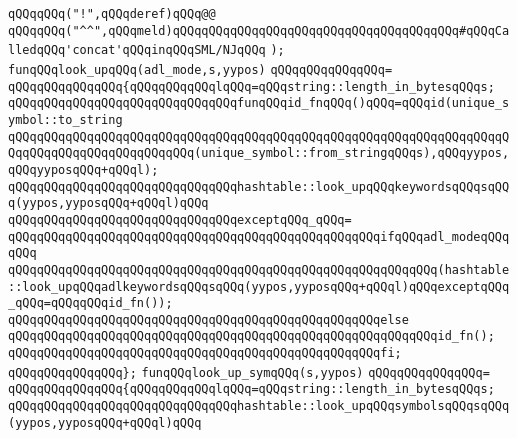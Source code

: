 \verb|qQQqqQQq("!",qQQqderef)qQQq@@|\newline
\verb|qQQqqQQq("^^",qQQqmeld)qQQqqQQqqQQqqQQqqQQqqQQqqQQqqQQqqQQqqQQq#qQQqCalledqQQq'concat'qQQqinqQQqSML/NJqQQq|\newline
\verb|);|\newline
\newline
\verb|funqQQqlook_upqQQq(adl_mode,s,yypos)|\newline
\verb|qQQqqQQqqQQqqQQq=|\newline
\verb|qQQqqQQqqQQqqQQq{qQQqqQQqqQQqlqQQq=qQQqstring::length_in_bytesqQQqs;|\newline
\newline
\verb|qQQqqQQqqQQqqQQqqQQqqQQqqQQqqQQqfunqQQqid_fnqQQq()qQQq=qQQqid(unique_symbol::to_string|\newline
\verb|qQQqqQQqqQQqqQQqqQQqqQQqqQQqqQQqqQQqqQQqqQQqqQQqqQQqqQQqqQQqqQQqqQQqqQQqqQQqqQQqqQQqqQQqqQQqqQQq(unique_symbol::from_stringqQQqs),qQQqyypos,qQQqyyposqQQq+qQQql);|\newline
\newline
\verb|qQQqqQQqqQQqqQQqqQQqqQQqqQQqqQQqhashtable::look_upqQQqkeywordsqQQqsqQQq(yypos,yyposqQQq+qQQql)qQQq|\newline
\verb|qQQqqQQqqQQqqQQqqQQqqQQqqQQqqQQqexceptqQQq_qQQq=|\newline
\verb|qQQqqQQqqQQqqQQqqQQqqQQqqQQqqQQqqQQqqQQqqQQqqQQqqQQqifqQQqadl_modeqQQqqQQq|\newline
\verb|qQQqqQQqqQQqqQQqqQQqqQQqqQQqqQQqqQQqqQQqqQQqqQQqqQQqqQQqqQQq(hashtable::look_upqQQqadlkeywordsqQQqsqQQq(yypos,yyposqQQq+qQQql)qQQqexceptqQQq_qQQq=qQQqqQQqid_fn());|\newline
\verb|qQQqqQQqqQQqqQQqqQQqqQQqqQQqqQQqqQQqqQQqqQQqqQQqqQQqelse|\newline
\verb|qQQqqQQqqQQqqQQqqQQqqQQqqQQqqQQqqQQqqQQqqQQqqQQqqQQqqQQqqQQqid_fn();|\newline
\verb|qQQqqQQqqQQqqQQqqQQqqQQqqQQqqQQqqQQqqQQqqQQqqQQqqQQqfi;|\newline
\verb|qQQqqQQqqQQqqQQq};|\newline
\newline
\verb|funqQQqlook_up_symqQQq(s,yypos)|\newline
\verb|qQQqqQQqqQQqqQQq=|\newline
\verb|qQQqqQQqqQQqqQQq{qQQqqQQqqQQqlqQQq=qQQqstring::length_in_bytesqQQqs;|\newline
\newline
\verb|qQQqqQQqqQQqqQQqqQQqqQQqqQQqqQQqhashtable::look_upqQQqsymbolsqQQqsqQQq(yypos,yyposqQQq+qQQql)qQQq|\newline
